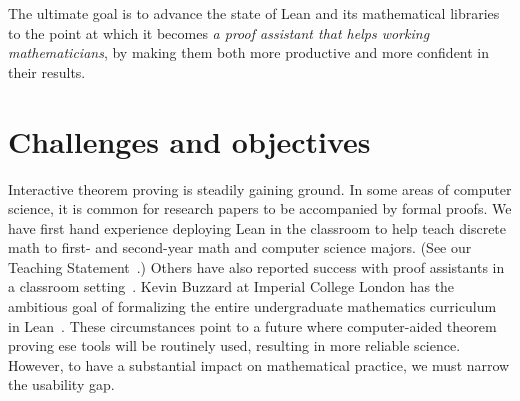 \documentclass[11pt]{amsart}  %
\begin{document}
The ultimate goal is to advance the state of Lean and its mathematical libraries to the point at which it becomes \emph{a proof assistant that helps working mathematicians}, by making them both
more productive and more confident in their results.













\section{Challenges and objectives}
Interactive theorem proving is steadily gaining ground. In some areas
of computer science, it is common for research papers to be accompanied by formal proofs. We have first hand experience deploying Lean in the classroom to help teach discrete math to first- and second-year math and computer science majors. (See our Teaching Statement~\cite{demeo:2018-teaching}.)  Others have also reported success with proof assistants in a classroom setting~\cite{nipkow:2012,pierce:2009}. 
Kevin Buzzard at Imperial College London has the ambitious goal of formalizing the entire undergraduate mathematics curriculum in Lean~\cite{buzzard}.
These circumstances point to a future where computer-aided theorem proving ese tools will be routinely used, resulting in more reliable science.
However, to have a substantial impact on mathematical practice, we must narrow the usability gap.
\end{document}
